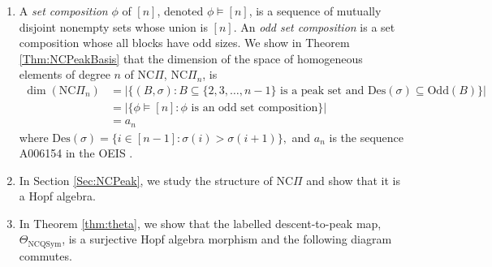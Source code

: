 \documentclass[11pt]{amsart}
\numberwithin{equation}{section}
\newcommand{\NCQSym}{\mathrm{NCQSym}}
\newcommand{\QSym}{\mathrm{QSym}}
\newcommand{\odd}{\mathrm{Odd}}
\newcommand{\NCPeak}{\mathrm{NC}\Pi}
\newcommand{\Des}{\mathrm{Des}}
\newcommand{\scrX}{{\mathscr{X}}}
\newcommand{\scrY}{{\mathscr{Y}}}
\newcommand{\scrE}{{\mathscr{E}}}
\newcommand{\scrF}{{\mathscr{F}}}
\newcommand{\bfG}{{\mathbf{G}}}
\begin{document}
\begin{enumerate}[leftmargin=*]
\item A \emph{set composition} $\phi$ of $[n]$,   denoted $\phi\vDash[n]$, is a sequence of mutually disjoint nonempty sets whose union is $[n]$. An \emph{odd set composition} is a set composition whose all blocks have odd sizes. We show in Theorem \ref{Thm:NCPeakBasis} that the dimension of the space of homogeneous elements of degree $n$ of $\NCPeak$, $\NCPeak_n$, is  
\begin{align*}
\dim(\NCPeak_n)& = |\{(B,\sigma): B\subseteq \{2,3,\dots,n-1\} \text{~is a peak set and~}\Des(\sigma)\subseteq \odd(B) \}| \\
&=|\{\phi\vDash [n]: \text{$\phi$ is an odd set composition} \}|\\
&=a_n
\end{align*}
where 
$\Des(\sigma)=\{i\in [n-1]: \sigma(i)>\sigma(i+1)\},$ and $a_n$ is the sequence A006154 in the OEIS \cite{OEISA006154}. 



\item  In Section \ref{Sec:NCPeak}, we study the structure of $\NCPeak$ and show that it is a Hopf algebra.


\item   In Theorem \ref{thm:theta}, we show that the labelled descent-to-peak map,
 $\Theta_{\NCQSym}$, is a surjective Hopf algebra morphism and the following diagram commutes.
 
\begin{center}
\end{center}
\end{enumerate}
\end{document}
